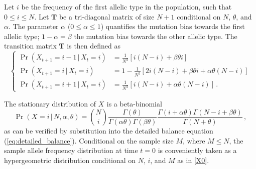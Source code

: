 \documentclass[preprint]{elsarticle}
\newcommand\given{{\,|\,}}
\newcommand\x[1]{\ensuremath{X_{#1}}}
\begin{document}
Let $i$ be the frequency of the first allelic type in the population, such that $0\leq i\leq N$. Let $\mathbf{T}$ be a tri-diagonal matrix of size $N+1$ conditional on $N$, $\theta$, and $\alpha$. The parameter $\alpha$ ($0 \leq \alpha \leq 1$) quantifies the mutation bias towards the first allelic type; $1-\alpha=\beta$ the mutation bias towards the other allelic type. The transition matrix $\mathbf{T}$ is then defined as
\begin{equation}\label{eq:transition_decoupled_Moran}
\begin{cases}
\Pr(\x{t+1}=i-1\given \x{t}=i)&=\frac1{N^2}\left[i(N-i)+\beta\theta i\right]\\
    \Pr(\x{t+1}=i\given \x{t}=i)&=1-\frac1{N^2}\left[2i(N-i)+\beta\theta i + \alpha\theta (N-i) \right]\\
\Pr(\x{t+1}=i+1\given \x{t}=i)&=\frac1{N^2}\left[i(N-i)+\alpha\theta (N-i)\right]\,.
\end{cases}
\end{equation}

The stationary distribution of $\x{}$ is a beta-binomial
\begin{equation}\label{beta_bin}
\Pr(\x{}=i\given N,\alpha,\theta)=\binom{N}{i}
\frac{\Gamma(\theta)}{\Gamma(\alpha\theta)\Gamma(\beta\theta)}
\frac{\Gamma(i+\alpha\theta)\Gamma(N-i+\beta\theta)}{\Gamma(N+\theta)}\,,
\end{equation}
as can be verified by substitution into the detailed balance equation (\ref{eq:detailed_balance}). 
Conditional on the sample size $M$, where $M\leq N$, the sample allele frequency distribution at time $t=0$ is conveniently taken as a hypergeometric distribution conditional on $N$, $i$, and $M$ as in \eqref{X0}.

\end{document}
